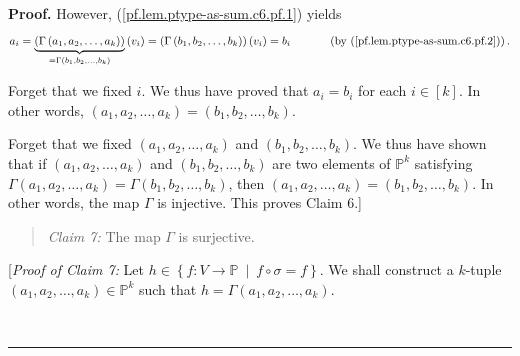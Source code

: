 \documentclass[numbers=enddot,12pt,final,onecolumn,notitlepage]{scrartcl}%
\numberwithin{exer}{section}
\theoremstyle{definition}
\newenvironment{statement}{\begin{quote}}{\end{quote}}
\newenvironment{proof}[1][Proof]{\noindent\textbf{#1.} }{\ \rule{0.5em}{0.5em}}
\newenvironment{verlong}{}{}
\begin{document}
\begin{verlong}
\begin{proof}
However, (\ref{pf.lem.ptype-as-sum.c6.pf.1}) yields%
\[
a_{i}=\underbrace{\left(  \Gamma\left(  a_{1},a_{2},\ldots,a_{k}\right)
\right)  }_{=\Gamma\left(  b_{1},b_{2},\ldots,b_{k}\right)  }\left(
v_{i}\right)  =\left(  \Gamma\left(  b_{1},b_{2},\ldots,b_{k}\right)  \right)
\left(  v_{i}\right)  =b_{i}\ \ \ \ \ \ \ \ \ \ \left(  \text{by
(\ref{pf.lem.ptype-as-sum.c6.pf.2})}\right)  .
\]


Forget that we fixed $i$. We thus have proved that $a_{i}=b_{i}$ for each
$i\in\left[  k\right]  $. In other words, $\left(  a_{1},a_{2},\ldots
,a_{k}\right)  =\left(  b_{1},b_{2},\ldots,b_{k}\right)  $.

Forget that we fixed $\left(  a_{1},a_{2},\ldots,a_{k}\right)  $ and $\left(
b_{1},b_{2},\ldots,b_{k}\right)  $. We thus have shown that if $\left(
a_{1},a_{2},\ldots,a_{k}\right)  $ and $\left(  b_{1},b_{2},\ldots
,b_{k}\right)  $ are two elements of $\mathbb{P}^{k}$ satisfying
$\Gamma\left(  a_{1},a_{2},\ldots,a_{k}\right)  =\Gamma\left(  b_{1}%
,b_{2},\ldots,b_{k}\right)  $, then $\left(  a_{1},a_{2},\ldots,a_{k}\right)
=\left(  b_{1},b_{2},\ldots,b_{k}\right)  $. In other words, the map $\Gamma$
is injective. This proves Claim 6.]

\begin{statement}
\textit{Claim 7:} The map $\Gamma$ is surjective.
\end{statement}

[\textit{Proof of Claim 7:} Let $h\in\left\{  f:V\rightarrow\mathbb{P}%
\ \mid\ f\circ\sigma=f\right\}  $. We shall construct a $k$-tuple $\left(
a_{1},a_{2},\ldots,a_{k}\right)  \in\mathbb{P}^{k}$ such that $h=\Gamma\left(
a_{1},a_{2},\ldots,a_{k}\right)  $.


\end{proof}
\end{verlong}
\end{document}
